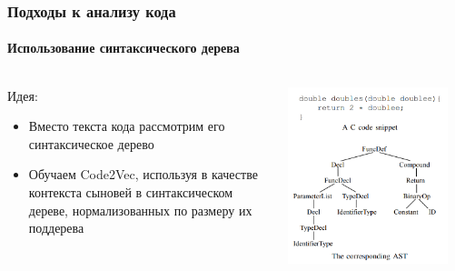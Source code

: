 \documentclass[10pt]{beamer}
\begin{document}

\begin{frame}
\frametitle{Подходы к анализу кода}
\framesubtitle{Использование синтаксического дерева}

\begin{columns}
    \begin{column}{0.6\textwidth}
		Идея:
        \begin{itemize}
			\item Вместо текста кода рассмотрим его синтаксическое дерево
			\item Обучаем Code2Vec, используя в качестве контекста сыновей в синтаксическом дереве, нормализованных по размеру их поддерева
		\end{itemize}
    \end{column}
    \begin{column}{0.4\textwidth}
        \begin{center}
            \includegraphics[width=0.9\textwidth]{images/ast.png} 
        \end{center}
    \end{column}
\end{columns}

\end{frame}
\end{document}
